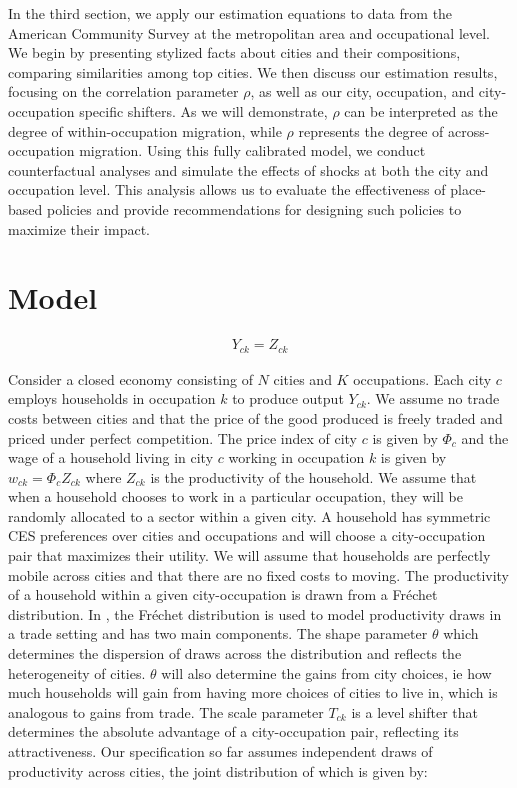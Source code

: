 \documentclass[10pt]{article}
\begin{document}
In the third section, we apply our estimation equations to data from the American Community Survey at the metropolitan area and occupational level. We begin by presenting stylized facts about cities and their compositions, comparing similarities among top cities. We then discuss our estimation results, focusing on the correlation parameter $\rho$, as well as our city, occupation, and city-occupation specific shifters. As we will demonstrate, $\rho$ can be interpreted as the degree of within-occupation migration, while $\rho$ represents the degree of across-occupation migration. Using this fully calibrated model, we conduct counterfactual analyses and simulate the effects of shocks at both the city and occupation level. This analysis allows us to evaluate the effectiveness of place-based policies and provide recommendations for designing such policies to maximize their impact.

\section{Model}

\begin{align*}
    Y_{ck} = Z_{ck}
\end{align*}

Consider a closed economy consisting of $N$ cities and $K$ occupations. Each city $c$ employs households in occupation $k$ to produce output $Y_{ck}$. We assume no trade costs between cities and that the price of the good produced is freely traded and priced under perfect competition. The price index of city $c$ is given by $\Phi_c$ and the wage of a household living in city $c$ working in occupation $k$ is given by $w_{ck} = \Phi_c Z_{ck}$ where $Z_{ck}$ is the productivity of the household. We assume that when a household chooses to work in a particular occupation, they will be randomly allocated to a sector within a given city. A household has symmetric CES preferences over cities and occupations and will choose a city-occupation pair that maximizes their utility. We will assume that households are perfectly mobile across cities and that there are no fixed costs to moving. The productivity of a household within a given city-occupation is drawn from a Fr\'{e}chet distribution. In \cite{ek}, the Fr\'{e}chet distribution is used to model productivity draws in a trade setting and has two main components. The shape parameter $\theta$ which determines the dispersion of draws across the distribution and reflects the heterogeneity of cities. $\theta$ will also determine the gains from city choices, ie how much households will gain from having more choices of cities to live in, which is analogous to gains from trade. The scale parameter $T_{ck}$ is a level shifter that determines the absolute advantage of a city-occupation pair, reflecting its attractiveness. Our specification so far assumes independent draws of productivity across cities, the joint distribution of which is given by:
\end{document}
